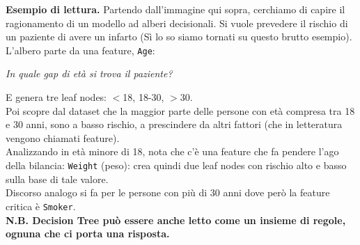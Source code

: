 \textbf{Esempio di lettura.} Partendo dall'immagine qui sopra, cerchiamo di capire il ragionamento di un modello ad alberi decisionali. Si vuole prevedere il rischio di un paziente di avere un infarto (Sì lo so siamo tornati su questo brutto esempio). 
\\
L'albero parte da una feature, \texttt{Age}:
\begin{center}
    \textit{In quale gap di età si trova il paziente?}
\end{center}
E genera tre leaf nodes: $<$18, 18-30, $>$30.
\\
Poi scopre dal dataset che la maggior parte delle persone con età compresa tra 18 e 30 anni, sono a basso rischio, a prescindere da altri fattori (che in letteratura vengono chiamati feature). 
\\ 
Analizzando in età minore di 18, nota che c'è una feature che fa pendere l'ago della bilancia: \texttt{Weight} (peso): crea quindi due leaf nodes con rischio alto e basso sulla base di tale valore. 
\\
Discorso analogo si fa per le persone con più di 30 anni dove però la feature critica è \texttt{Smoker}.
\\[3ex]
\textbf{N.B. Decision Tree può essere anche letto come un insieme di regole, ognuna che ci porta una risposta.}

\newpage

